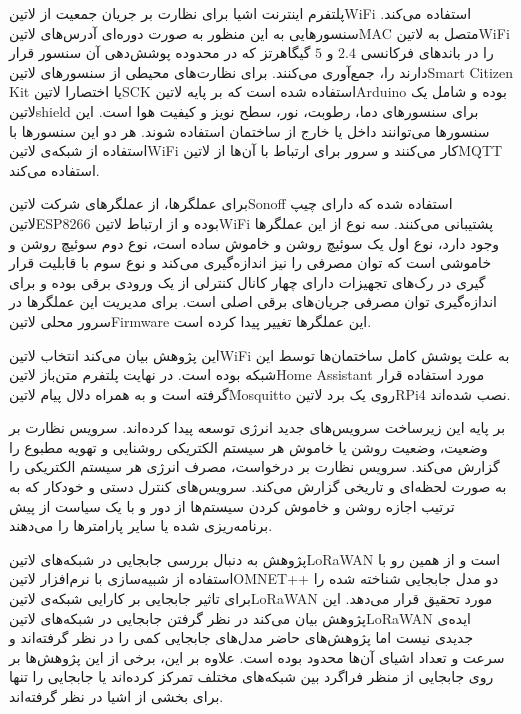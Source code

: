 پلتفرم اینترنت اشیا برای نظارت بر جریان جمعیت از ‌لاتین{WiFi} استفاده می‌کند. سنسورهایی به این منظور به صورت دوره‌ای آدرس‌های ‌لاتین{MAC} متصل به
‌لاتین{WiFi} را در باندهای فرکانسی $2.4$ و $5$ گیگاهرتز که در محدوده پوشش‌دهی آن سنسور قرار دارند را، جمع‌آوری می‌کنند.
برای نظارت‌های محیطی از سنسورهای ‌لاتین{Smart Citizen Kit} یا اختصارا ‌لاتین{SCK} استفاده شده است که بر پایه ‌لاتین{Arduino} بوده
و شامل یک ‌لاتین{shield} برای سنسورهای دما، رطوبت، نور، سطح نویز و کیفیت هوا است. این سنسورها می‌توانند داخل یا خارج از ساختمان استفاده شوند.
هر دو این سنسورها با استفاده از شبکه‌ی ‌لاتین{WiFi} کار می‌کنند و سرور برای ارتباط با آن‌ها از ‌لاتین{MQTT} استفاده می‌کند.

برای عملگرها، از عملگرهای شرکت ‌لاتین{Sonoff} استفاده شده که دارای چیپ ‌لاتین{ESP8266} بوده و از ارتباط ‌لاتین{WiFi} پشتیبانی می‌کنند.
سه نوع از این عملگرها وجود دارد، نوع اول یک سوئیچ روشن و خاموش ساده است، نوع دوم سوئیچ روشن و خاموشی است که توان مصرفی را نیز اندازه‌گیری می‌کند و
نوع سوم با قابلیت قرار گیری در رک‌های تجهیزات دارای چهار کانال کنترلی از یک ورودی برقی بوده و برای اندازه‌گیری توان مصرفی جریان‌های برقی اصلی است.
برای مدیریت این عملگرها در سرور محلی ‌لاتین{Firmware} این عملگرها تغییر پیدا کرده است.

این پژوهش بیان می‌کند انتخاب ‌لاتین{WiFi} به علت پوشش کامل ساختمان‌ها توسط این شبکه بوده است.
در نهایت پلتفرم متن‌باز ‌لاتین{Home Assistant} مورد استفاده قرار گرفته است و به همراه دلال پیام ‌لاتین{Mosquitto} روی یک برد ‌لاتین{RPi4}
نصب شده‌اند.

بر پایه این زیرساخت سرویس‌های جدید انرژی توسعه پیدا کرده‌اند. سرویس نظارت بر وضعیت، وضعیت روشن یا خاموش هر سیستم الکتریکی روشنایی و تهویه مطبوع را
گزارش می‌کند. سرویس نظارت بر درخواست، مصرف انرژی هر سیستم الکتریکی را به صورت لحظه‌ای و تاریخی گزارش می‌کند. سرویس‌های کنترل دستی و خودکار که به ترتیب
اجازه روشن و خاموش کردن سیستم‌ها از دور و با یک سیاست از پیش برنامه‌ریزی شده یا سایر پارامترها را می‌دهند.


پژوهش  به دنبال بررسی جابجایی در شبکه‌های ‌لاتین{LoRaWAN} است و از همین رو با استفاده از شبیه‌سازی با نرم‌افزار ‌لاتین{OMNET++}
دو مدل جابجایی شناخته شده را برای تاثیر جابجایی بر کارایی شبکه‌ی ‌لاتین{LoRaWAN} مورد تحقیق قرار می‌دهد. این پژوهش بیان می‌کند در نظر گرفتن جابجایی در شبکه‌های
‌لاتین{LoRaWAN} ایده‌ی جدیدی نیست اما پژوهش‌های حاضر مدل‌های جابجایی کمی را در نظر گرفته‌اند و سرعت و تعداد اشیای آن‌ها محدود بوده است.
علاوه بر این، برخی از این پژوهش‌ها بر روی جابجایی از منظر فراگرد بین شبکه‌های مختلف تمرکز کرده‌اند یا جابجایی را تنها برای بخشی از اشیا در نظر گرفته‌اند.

